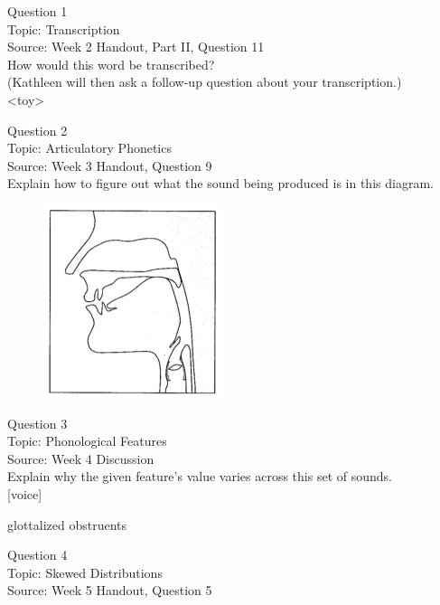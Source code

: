 \documentclass[12pt]{article}
\begin{document}
{\large Question 1}\\

Topic: Transcription\\
Source: Week 2 Handout, Part II, Question 11\\

How would this word be transcribed?\\ (Kathleen will then ask a follow-up question about your transcription.)\\

<toy>


\newpage

{\large Question 2}\\

Topic: Articulatory Phonetics\\
Source: Week 3 Handout, Question 9\\

Explain how to figure out what the sound being produced is in this diagram.\\

\begin{figure}[H]
\includegraphics{../images/sagittal_k.png}
\end{figure}

\newpage

{\large Question 3}\\

Topic: Phonological Features\\
Source: Week 4 Discussion\\

Explain why the given feature's value varies across this set of sounds.\\

{[voice]}

glottalized obstruents


\newpage

{\large Question 4}\\

Topic: Skewed Distributions\\
Source: Week 5 Handout, Question 5\\
\end{document}
